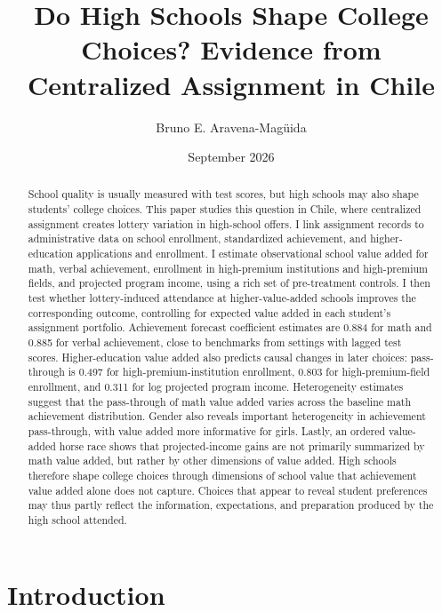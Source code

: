 \documentclass[a4paper, article, english, oneside, unknownkeysallowed, 12pt]{memoir}
\title{Do High Schools Shape College Choices? Evidence from Centralized Assignment in Chile}
\author{ Bruno E. Aravena-Magüida}
\date{September 2026}
\begin{document}
\maketitle

\begin{abstract}
School quality is usually measured with test scores, but high schools may also shape students' college choices.
This paper studies this question in Chile, where centralized assignment creates lottery variation in high-school offers.
I link assignment records to administrative data on school enrollment, standardized achievement, and higher-education applications and enrollment.
I estimate observational school value added for math, verbal achievement, enrollment in high-premium institutions and high-premium fields, and projected program income, using a rich set of pre-treatment controls.
I then test whether lottery-induced attendance at higher-value-added schools improves the corresponding outcome, controlling for expected value added in each student's assignment portfolio.
Achievement forecast coefficient estimates are 0.884 for math and 0.885 for verbal achievement, close to benchmarks from settings with lagged test scores.
Higher-education value added also predicts causal changes in later choices: pass-through is 0.497 for high-premium-institution enrollment, 0.803 for high-premium-field enrollment, and 0.311 for log projected program income.
Heterogeneity estimates suggest that the pass-through of math value added varies across the baseline math achievement distribution.
Gender also reveals important heterogeneity in achievement pass-through, with value added more informative for girls.
Lastly, an ordered value-added horse race shows that projected-income gains are not primarily summarized by math value added, but rather by other dimensions of value added.
High schools therefore shape college choices through dimensions of school value that achievement value added alone does not capture.
Choices that appear to reveal student preferences may thus partly reflect the information, expectations, and preparation produced by the high school attended.
\end{abstract}

\setcounter{tocdepth}{2}
\renewcommand\contentsname{}

\clearpage
\section{Introduction}
\end{document}
